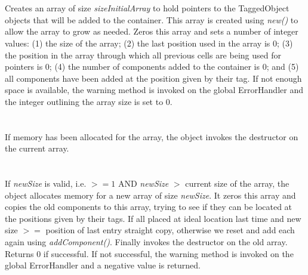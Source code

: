  \\
 \\
Creates an array of size {\em sizeInitialArray} to hold pointers to
the TaggedObject objects that will be added to the container. This
array is created using {\em new()} to allow the array to grow as
needed. Zeros this array and sets a number of integer values: (1) the
size of the array; (2) the last position used in the array is $0$; (3)
the position in the array through which all previous cells are being
used for pointers is $0$; (4) the number of components added to the
container is $0$; and (5) all components have been added at the
position given by their tag. If not enough space is available, the
warning method is invoked on the global ErrorHandler and the integer
outlining the array size is set to $0$. \\ 

 \\
 \\ 
If memory has been allocated for the array, the object invokes the
destructor on the current array. \\ 

 \\
\\
If {\em newSize} is valid, i.e. $>= 1$ AND {\em newSize} $>$ current
size of the array, the object allocates memory for a new array of size
{\em newSize}. It zeros this array and copies the old components to
this array, trying to see if they can be located at the positions
given by their tags. If all placed at ideal location last time and new
size $>=$ position of last entry straight copy, otherwise we reset and
add each again using {\em addComponent()}. Finally invokes the
destructor on the old array. Returns $0$ if successful. If not
successful, the warning method is invoked on the global ErrorHandler
and a negative value is returned.\\ 


